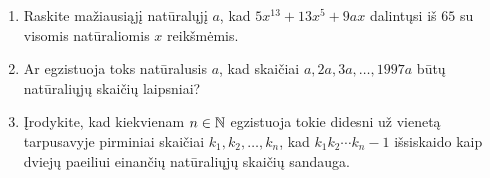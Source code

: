 \begin{enumerate}
  \item \text{[Ireland 2000]} Raskite mažiausiąjį natūralųjį $a$, kad
    $5x^{13} + 13x^5 + 9ax$ dalintųsi iš $65$ su visomis natūraliomis $x$
    reikšmėmis.
  \item Ar egzistuoja toks natūralusis $a$, kad skaičiai $a, 2a, 3a, \dots,
    1997a$ būtų natūraliųjų skaičių laipsniai?
  \item \text{[USAMO 2008]} Įrodykite, kad kiekvienam $n\in \mathbb N$
    egzistuoja tokie didesni už vienetą tarpusavyje pirminiai skaičiai
    $k_1, k_2, \dots, k_n$, kad $k_1 k_2 \cdots k_n-1$ išsiskaido kaip
    dviejų paeiliui einančių natūraliųjų skaičių sandauga. 

\end{enumerate}
